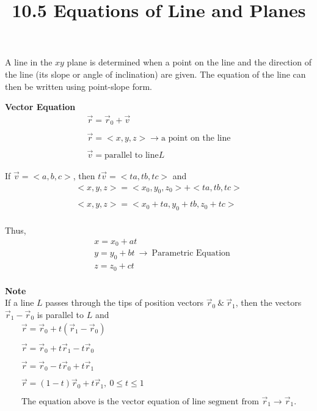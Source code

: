 \documentclass{article}
\title{10.5 Equations of Line and Planes}
\begin{document}
  \maketitle
  A line in the $ xy $ plane is determined when a point on the line and the direction of the line (its slope or angle of inclination) are given. The equation of the line can then be written using point-slope form.

  \textbf{Vector Equation}
  \[
    \begin{gathered}
    \vec{r}=\vec{r}_{0}+\vec{v}\\
    ~\\
    \vec{r}=< x, y, z> \to \text{a point on the line}\\
    ~\\
    \vec{v}=\text{parallel to line} L 
    \end{gathered}
  \]

  If $ \vec{v}=< a, b, c>$, then $ t\vec{v}=< ta, tb, tc>$ and
 \[
   \begin{gathered}
  < x, y, z>=< x_{0}, y_{0} ,z_{0}  >+< ta, tb, tc>\\
  ~\\
  < x, y, z> =< x_{0} +ta,y_{0} +tb ,z_{0}+tc>~\\ 
   \end{gathered}
 \]

 Thus, 
 \[
   \begin{aligned}
   &x=x_{0}+at\\
   &y=y_{0}+bt~\to~\text{Parametric Equation}\\
   &z=z_{0}+ct\\ 
   \end{aligned}
 \]

  \textbf{Note}\\
  If a line $ L $ passes through the tips of position vectors $ \vec{r}_{0}  ~\&~\vec{r}_{1} $, then the vectors $ \vec{r}_{1} - \vec{r}_{0}$ is parallel to $ L $ and
  \[
    \begin{gathered}
    \vec{r}=\vec{r}_{0}+t(\vec{r}_{1} -\vec{r}_{0} )\\
    ~\\
    \vec{r}=\vec{r}_{0}+t\vec{r}_{1}-t\vec{r}_{0}\\
    ~\\
    \vec{r}=\vec{r}_{0}-t\vec{r}_{0}+t\vec{r}_{1}\\
    ~\\
    \vec{r}=(1-t)\vec{r}_{0}+t\vec{r}_{1},~0\le t \le 1\\
    ~\\
    \text{The equation above is the vector equation of line segment from } \vec{r}_{1} \to \vec{r}_{1}.  
    \end{gathered}
  \]
  
\end{document}
